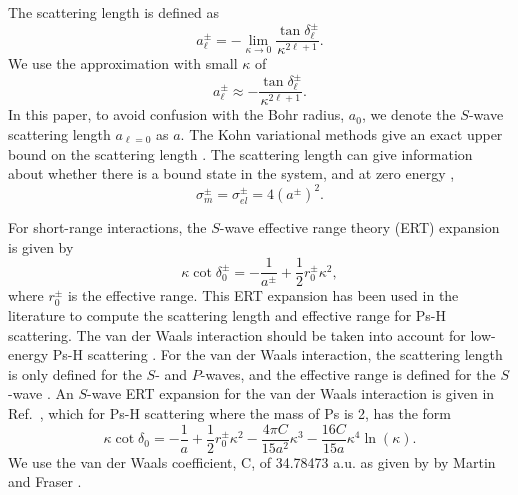 \documentclass[preprint,showpacs,showkeys,preprintnumbers,amsmath,amssymb,longbibliography,pra,aps]{revtex4-1}
\begin{document}
The scattering length is defined as \cite{Bransden2003}
\begin{equation}
\label{eq:ScatLen}
a_\ell^\pm = -\lim_{\kappa \to 0}
  \frac{\tan{\delta_\ell^\pm}}{\kappa^{2\ell+1}}.
\end{equation}
We use the approximation with small $\kappa$ of
\begin{equation}
\label{eq:ScatLenApprox}
a_\ell^\pm \approx
  - \frac{\tan{\delta_\ell^\pm}}{\kappa^{2\ell+1}}.
\end{equation}
In this paper, to avoid confusion with the Bohr radius, $a_0$, we denote
the $S$-wave scattering length $a_{\ell=0}$ as $a$. The
Kohn variational methods give an exact upper bound on the scattering length
\cite{Joachain1979}. The scattering length can give information about whether
there is a bound state in the system, and at zero energy \cite{Buckman1989},
\begin{equation}
\label{eq:ScatLenCross}
\sigma_m^\pm = \sigma_{el}^\pm = 4 (a^\pm)^2 .
\end{equation}

For short-range interactions, the $S$-wave effective range theory (ERT)
expansion is given by \cite{Bethe1949,Blatt1949}
\begin{equation}
\label{eq:EffectiveRangeShort}
\kappa \cot\delta_0^\pm = -\frac{1}{a^\pm} + \frac{1}{2} r_0^\pm \kappa^2,
\end{equation}
where $r_0^\pm$ is the effective range.
This ERT expansion has been used in the literature
\cite{Ivanov2002,VanReeth2003,Blackwood2002,Walters2004} to compute the
scattering length and effective range for Ps-H scattering. The van
der Waals interaction should be taken into account for low-energy Ps-H
scattering \cite{Fabrikant2014,VanReeth2003}. For the van der Waals
interaction, the scattering length is only defined for the $S$- and
$P$-waves, and the 
effective range is defined for the $S$-wave \cite{Levy1963}.
An $S$-wave ERT expansion for the van der Waals interaction is given in
Ref.~\cite{Drake2006}, which for Ps-H scattering where the mass of Ps
is 2, has the form
\begin{equation}
\label{eq:EffectiveRangeLongAu}
\kappa \cot\delta_0 = -\frac{1}{a} + \frac{1}{2} r_0^\pm \kappa^2 - 
  \frac{4 \pi C}{15 a^2} \kappa^3 - 
  \frac{16 C}{15 a} \kappa^4 \ln \left(\kappa \right).
\end{equation}
We use the van der Waals coefficient, C, of 34.78473 a.u. as given by
by Martin and Fraser \cite{Martin1980}.
\end{document}
